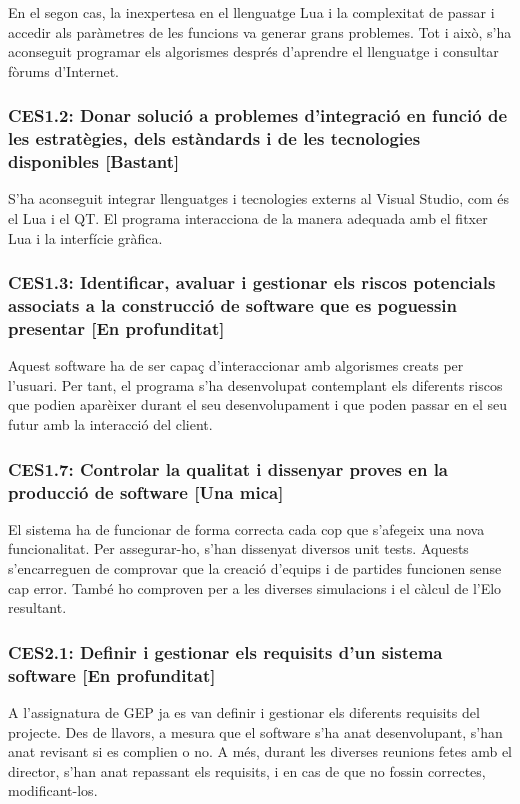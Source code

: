 \documentclass[a4paper]{article}
\begin{document}
En el segon cas, la inexpertesa en el llenguatge Lua i la complexitat de passar i accedir als paràmetres de les funcions va generar grans problemes. Tot i això, s'ha aconseguit programar els algorismes després d'aprendre el llenguatge i consultar fòrums d'Internet.

\subsubsection*{CES1.2: Donar solució a problemes d'integració en funció de les estratègies, dels estàndards i de les tecnologies disponibles [Bastant]}

S'ha aconseguit integrar llenguatges i tecnologies externs al Visual Studio, com és el Lua i el QT. El programa interacciona de la manera adequada amb el fitxer Lua i la interfície gràfica. 

\subsubsection*{CES1.3: Identificar, avaluar i gestionar els riscos potencials associats a la construcció de software que es poguessin presentar [En profunditat]}

Aquest software ha de ser capaç d'interaccionar amb algorismes creats per l'usuari. Per tant, el programa s'ha desenvolupat contemplant els diferents riscos que podien aparèixer durant el seu desenvolupament i que poden passar en el seu futur amb la interacció del client.

\subsubsection*{CES1.7: Controlar la qualitat i dissenyar proves en la producció de software [Una mica]}

El sistema ha de funcionar de forma correcta cada cop que s'afegeix una nova funcionalitat. Per assegurar-ho, s'han dissenyat diversos unit tests. Aquests s'encarreguen de comprovar que la creació d'equips i de partides funcionen sense cap error. També ho comproven per a les diverses simulacions i el càlcul de l'Elo resultant.

\subsubsection*{CES2.1: Definir i gestionar els requisits d'un sistema software [En profunditat]}

A l'assignatura de GEP ja es van definir i gestionar els diferents requisits del projecte. Des de llavors, a mesura que el software s'ha anat desenvolupant, s'han anat revisant si es complien o no. A més, durant les diverses reunions fetes amb el director, s'han anat repassant els requisits, i en cas de que no fossin correctes, modificant-los.
\end{document}
